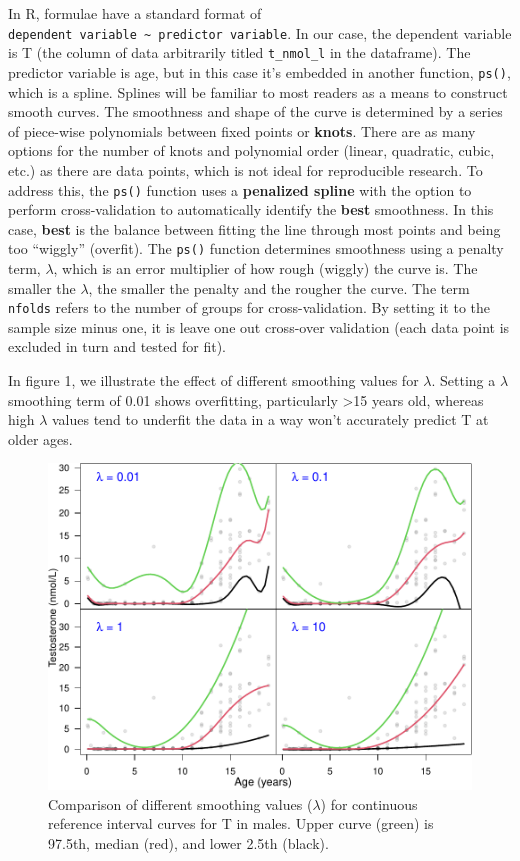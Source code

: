 \documentclass[]{elsarticle} %
\begin{document}
In R, formulae have a standard format of
\texttt{dependent\ variable\ \textasciitilde{}\ predictor\ variable}. In
our case, the dependent variable is T (the column of data arbitrarily
titled \texttt{t\_nmol\_l} in the dataframe). The predictor variable is
age, but in this case it's embedded in another function, \texttt{ps()},
which is a spline. Splines will be familiar to most readers as a means
to construct smooth curves. The smoothness and shape of the curve is
determined by a series of piece-wise polynomials between fixed points or
\textbf{knots}. There are as many options for the number of knots and
polynomial order (linear, quadratic, cubic, etc.) as there are data
points, which is not ideal for reproducible research. To address this,
the \texttt{ps()} function uses a \textbf{penalized spline} with the
option to perform cross-validation to automatically identify the
\textbf{best} smoothness. In this case, \textbf{best} is the balance
between fitting the line through most points and being too ``wiggly''
(overfit). The \texttt{ps()} function determines smoothness using a
penalty term, \(\lambda\), which is an error multiplier of how rough
(wiggly) the curve is. The smaller the \(\lambda\), the smaller the
penalty and the rougher the curve. The term \texttt{nfolds} refers to
the number of groups for cross-validation. By setting it to the sample
size minus one, it is leave one out cross-over validation (each data
point is excluded in turn and tested for fit).

In figure 1, we illustrate the effect of different smoothing values for
\(\lambda\). Setting a \(\lambda\) smoothing term of 0.01 shows
overfitting, particularly \textgreater15 years old, whereas high
\(\lambda\) values tend to underfit the data in a way won't accurately
predict T at older ages.

\begin{figure}[H]
\includegraphics{smoothingfig1-1} \caption{\label{fig:fig1}Comparison of different smoothing values ($\lambda$) for continuous reference interval curves for T in males. Upper curve (green) is 97.5th, median (red), and lower 2.5th (black).}\label{fig:smoothingfig1}
\end{figure}
\end{document}
